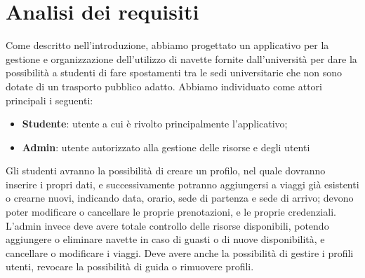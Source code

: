 \section{Analisi dei requisiti}
Come descritto nell'introduzione, abbiamo progettato un applicativo per la gestione e organizzazione dell'utilizzo di navette fornite dall'università per dare la possibilità a studenti di fare spostamenti tra le sedi universitarie che non sono dotate di un trasporto pubblico adatto.
Abbiamo individuato come attori principali i seguenti:
\begin{itemize}
    \item \textbf{Studente}: utente a cui è rivolto principalmente l'applicativo; 
    \item \textbf{Admin}:  utente autorizzato alla gestione delle risorse e degli utenti
\end{itemize}
Gli studenti avranno la possibilità di creare un profilo, nel quale dovranno inserire i propri dati, e successivamente potranno aggiungersi a viaggi già esistenti o crearne nuovi, indicando data, orario, sede di partenza e sede di arrivo; devono poter modificare o cancellare le proprie prenotazioni, e le proprie credenziali.
\\L'admin invece deve avere totale controllo delle risorse disponibili, potendo aggiungere o eliminare navette in caso di guasti o di nuove disponibilità, e cancellare o modificare i viaggi. Deve avere anche la possibilità di gestire i profili utenti, revocare la possibilità di guida o rimuovere profili.
